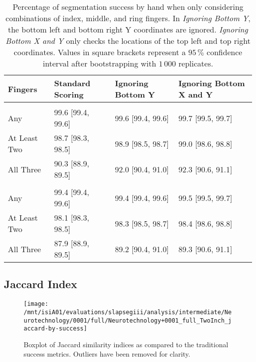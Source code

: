 \documentclass[]{article}
\begin{document}
\begin{table}[!h]

\caption{\label{tab:twoinch-per-hand-index-middle-ring-ci}Percentage of segmentation success by hand when only considering combinations of index, middle, and ring fingers. In \textit{Ignoring Bottom Y}, the bottom left and bottom right Y coordinates are ignored. \textit{Ignoring Bottom X and Y} only checks the locations of the top left and top right coordinates. Values in square brackets represent a \(95\,\%\) confidence interval after bootstrapping with \(1\,000\) replicates.}
\centering
\begin{tabular}{llll}
\toprule
Fingers & Standard Scoring & Ignoring Bottom Y & Ignoring Bottom X and Y\\
\midrule
\addlinespace[0.3em]
\multicolumn{4}{l}{\textbf{Right}}\\
\rowcolor{gray!6}  \hspace{1em}Any & 99.6 [99.4, 99.6] & 99.6 [99.4, 99.6] & 99.7 [99.5, 99.7]\\
\hspace{1em}At Least Two & 98.7 [98.3, 98.5] & 98.9 [98.5, 98.7] & 99.0 [98.6, 98.8]\\
\rowcolor{gray!6}  \hspace{1em}All Three & 90.3 [88.9, 89.5] & 92.0 [90.4, 91.0] & 92.3 [90.6, 91.1]\\
\addlinespace[0.3em]
\multicolumn{4}{l}{\textbf{Left}}\\
\hspace{1em}Any & 99.4 [99.4, 99.6] & 99.4 [99.4, 99.6] & 99.5 [99.5, 99.7]\\
\rowcolor{gray!6}  \hspace{1em}At Least Two & 98.1 [98.3, 98.5] & 98.3 [98.5, 98.7] & 98.4 [98.6, 98.8]\\
\hspace{1em}All Three & 87.9 [88.9, 89.5] & 89.2 [90.4, 91.0] & 89.3 [90.6, 91.1]\\
\bottomrule
\end{tabular}
\end{table}

\clearpage

\subsection{Jaccard Index}\label{jaccard-index}

\begin{figure}

{\centering \texttt{[image: /mnt/isiA01/evaluations/slapsegiii/analysis/intermediate/Neurotechnology/0001/full/Neurotechnology+0001\_full\_TwoInch\_jaccard-by-success]} 

}

\caption{Boxplot of Jaccard similarity indices as compared to the traditional success metrics. Outliers have been removed for clarity.}\label{fig:twoinch-jaccard-success}
\end{figure}
\end{document}
